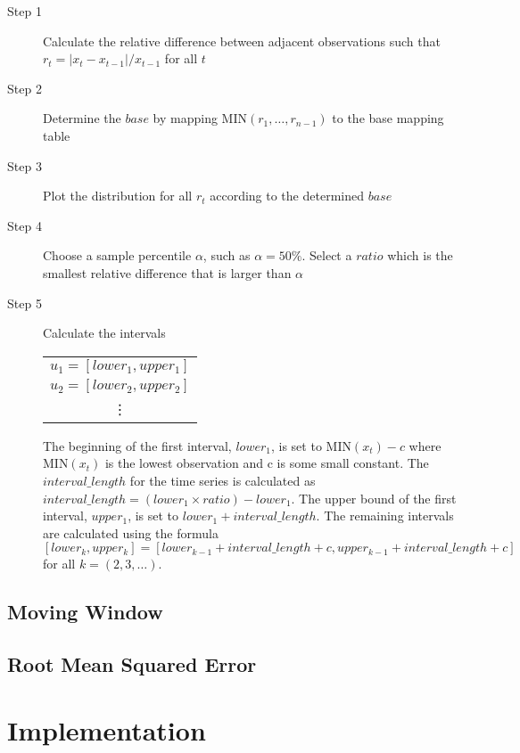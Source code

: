 \documentclass[12pt]{article}
\theoremstyle{definition}
\begin{document}
\begin{description}
\item[Step 1] Calculate the relative difference between adjacent observations such that $r_t=|x_t-x_{t-1}|/x_{t-1}$ for all $t$
\item[Step 2] Determine the $base$ by mapping MIN$(r_1,\ldots,r_{n-1})$ to the base mapping table
\item[Step 3] Plot the distribution for all $r_t$ according to the determined $base$
\item[Step 4] Choose a sample percentile $\alpha$, such as $\alpha=50\%$. Select a $ratio$ which is the smallest relative difference that is larger than $\alpha$
\item[Step 5] Calculate the intervals 

\begin{table}[H]
	\center
	\begin{tabular}{ c }
	  	$u_1 = [lower_1, upper_1]$ \\
	  	$u_2 = [lower_2, upper_2]$ \\
	  	\vdots \\
	\end{tabular}
\end{table}

The beginning of the first interval, $lower_1$, is set to MIN$(x_t)-c$ where MIN$(x_t)$ is the lowest observation and c is some small constant. The $interval\_length$ for the time series is calculated as $interval\_length=(lower_1 \times ratio) - lower_1$. The upper bound of the first interval, $upper_1$, is set to $lower_1 + interval\_length$. The remaining intervals are calculated using the formula $[lower_k,upper_k]=[lower_{k-1}+interval\_length+c, upper_{k-1}+interval\_length+c]$ for all $k=(2,3,\ldots)$.
\end{description}

\subsection{Moving Window}

\subsection{Root Mean Squared Error}

\label{rmse}

\section{Implementation}
\end{document}
